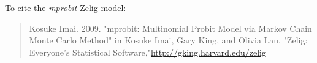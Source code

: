 To cite the \emph{ mprobit } Zelig model:
 \begin{verse}
 Kosuke Imai. 2009. "mprobit: Multinomial Probit Model via Markov Chain Monte Carlo Method" in Kosuke Imai, Gary King, and Olivia Lau, "Zelig: Everyone's Statistical Software,"\url{http://gking.harvard.edu/zelig} 
\end{verse}